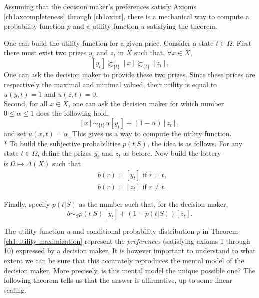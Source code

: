 \begin{example}
Assuming that the decision maker's preferences satisfy Axioms \ref{ch1axcompleteness} through \ref{ch1axint}, there is a mechanical way to compute a probability function $p$ and a utility function $u$ satisfying the theorem.

One can build the utility function for a given price. Consider a state $t \in \Omega$. First there must exist two prizes $y_t$ and $z_t$ in $X$ such that, $\forall x \in X$,
$$ [y_t]\succsim_{\{t\}} [x] \succsim_{\{t\}} [z_t].$$
One can ask the decision maker to provide these two prizes. Since these prices are respectively the maximal and minimal valued, their utility is equal to $u(y,t)=1$ and
$u(z,t)=0$.\\
Second, for all $x \in X$, one can ask the decision maker for which number $0 \leq \alpha \leq 1 $ does the following hold,
$$ [x] \sim_{\{t\}} \alpha[y_t] + (1-\alpha) [z_t],$$
and set $u(x,t) = \alpha.$
This gives us a way to compute the utility function. \\*
To build the subjective probabilities $p(t|S)$, the idea is as follows. For any state $t\in \Omega$, define the prizes $y_t$ and $z_t$ as before. Now build the lottery $b : \Omega \mapsto \Delta(X)$ such that
$$
\begin{aligned}
& b(r) = [y_t] \text{ if $r=t$}, \\
& b(r) = [z_t] \text{ if $r \neq t$}.
\end{aligned}
$$

Finally, specify $p(t|S)$ as the number such that, for the decision maker,
$$ b \sim_S p(t|S) [y_t] + (1-p(t|S)) [z_t].$$

\end{example}


The utility function $u$ and conditional probability distribution $p$ in Theorem \ref{ch1:utility-maximization} represent the \emph{preferences} (satisfying axioms 1 through 10) expressed by a decision maker.
It is however important to understand to what extent  we can be sure that this accurately reproduces the mental model of the decision maker. More precisely, is this mental model the unique possible one?  The following theorem tells us that the answer is affirmative, up to some linear scaling.

